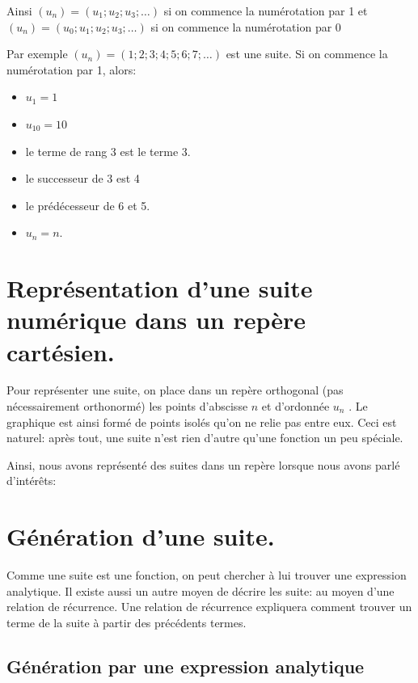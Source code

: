 \documentclass[a4paper,12pt]{report}
\begin{document}
Ainsi \((u_n)=(u_1;u_2;u_3;\ldots)\) si on commence la numérotation par 1 et
\((u_n)=(u_0;u_1;u_2;u_3;\ldots)\) si on commence la numérotation par 0

Par exemple \((u_n)=(1;2;3;4;5;6;7;\ldots)\) est une suite. Si on commence la
numérotation par 1, alors:
\begin{itemize}
\item \(u_1=1\)
\item \(u_{10}=10\)
\item le terme de rang 3 est le terme 3.
\item le successeur de 3 est 4
\item le prédécesseur de 6 et 5.
\item \(u_n=n\).
\end{itemize}

\section{Représentation d'une suite numérique dans un repère cartésien.}
\label{sec:orgc071f5a}

Pour représenter une suite, on place dans un repère orthogonal (pas nécessairement
orthonormé) les points d’abscisse \(n\) et d’ordonnée \(u_n\) . Le graphique est ainsi formé de
points isolés qu’on ne relie pas entre eux. Ceci est naturel: après tout, une
suite n'est rien d'autre qu'une fonction un peu spéciale.

Ainsi, nous avons représenté des suites dans un repère lorsque nous avons parlé
d'intérêts:
\begin{center}

\end{center}

\section{Génération d'une suite.}
\label{sec:org84f656e}

Comme une suite est une fonction, on peut chercher à lui trouver une expression
analytique. Il existe aussi un autre moyen de décrire les suite: au moyen d'une
relation de récurrence. Une relation de récurrence expliquera comment trouver un
terme de la suite à partir des précédents termes.

\subsection{Génération par une expression analytique}
\label{sec:orgf08d034}
\end{document}
